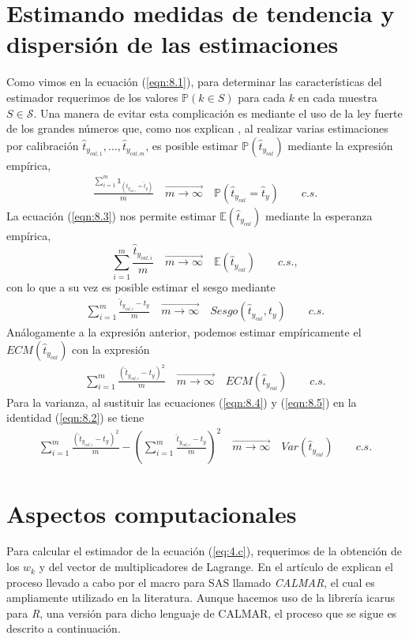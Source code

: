 \documentclass[a4paper,twoside,openright,12pt]{book}
\def\one{\mathds{1}}%
\theoremstyle{definition}
\newcommand\pref[1]{(\ref{#1})}
\numberwithin{equation}{chapter}
\numberwithin{figure}{chapter}
\numberwithin{table}{chapter}
\numberwithin{theorem}{chapter}
\numberwithin{lemma}{chapter}
\begin{document}
\section{Estimando medidas de tendencia y dispersión de las estimaciones}\label{sec:8.5}
Como vimos en la ecuación \pref{eqn:8.1}, para determinar las características del estimador requerimos de los valores $\mathbb{P}(k\in S)$ para cada $k$ en cada muestra $S\in \mathcal S$. Una manera de evitar esta complicación es mediante el uso de la ley fuerte de los grandes números que, como nos explican \cite{CIS-9995}, al realizar varias estimaciones por calibración $\hat t_{y_{cal,1}},\ldots, \hat t_{y_{cal,m}}$, es  posible estimar $\mathbb{P}(\hat t_{y_{cal}})$ mediante la expresión empírica,
\begin{align}\label{eqn:8.3}
\frac{\sum_{i=1}^m \one_{(\hat t_{y_{cal,i}}=\hat t_y)}}{m}\quad\overset{\longrightarrow}{\scriptscriptstyle m \rightarrow \infty}\quad \mathbb{P}(\hat t_{y_{cal}}=\hat t_y)\qquad c.s.
\end{align}
La ecuación \pref{eqn:8.3} nos permite estimar $\mathbb{E}(\hat t_{y_{cal}})$ mediante la esperanza empírica,
$$\sum_{i=1}^m \frac{\hat t_{y_{cal, i}}}{m}\quad\overset{\longrightarrow}{\scriptscriptstyle m \rightarrow \infty}\quad\mathbb E(\hat t_{y_{cal}})\qquad c.s.,$$
con lo que a su vez es posible estimar el sesgo mediante
\begin{align}\label{eqn:8.4}
	\sum_{i=1}^m \frac{\hat t_{y_{cal,i}}-t_y}{m}\quad\overset{\longrightarrow}{\scriptscriptstyle m \rightarrow \infty}\quad Sesgo(\hat t_{y_{cal}},t_y)\qquad c.s.
\end{align}
Análogamente a la expresión anterior, podemos estimar empíricamente el $ECM(\hat t_{y_{cal}})$ con la expresión
\begin{align}\label{eqn:8.5}
	\sum_{i=1}^m \frac{(\hat t_{y_{cal,i}}-t_{y})^2}{m}\quad\overset{\longrightarrow}{\scriptscriptstyle m \rightarrow \infty}\quad ECM(\hat t_{y_{cal}})\qquad c.s.
\end{align}
Para la varianza, al sustituir las ecuaciones \pref{eqn:8.4} y \pref{eqn:8.5} en la identidad \pref{eqn:8.2} se tiene
\begin{align}\label{eqn:8.6}
	\sum_{i=1}^m \frac{(\hat t_{y_{cal,i}}-t_{y})^2}{m}-\left(\sum_{i=1}^m \frac{\hat t_{y_{cal,i}}-t_y}{m}\right)^2\quad\overset{\longrightarrow}{\scriptscriptstyle m \rightarrow \infty}\quad Var(\hat t_{y_{cal}})\qquad c.s.
\end{align}
\section{Aspectos computacionales}\label{sec:9}
Para calcular el estimador de la ecuación \pref{eq:4.c}, requerimos de la obtención de los $w_k$ y del vector de multiplicadores de Lagrange. En el artículo de \cite{CIS-112732} explican el proceso llevado a cabo por el macro para SAS llamado \textsl{CALMAR}, el cual es ampliamente utilizado en la literatura. Aunque hacemos uso de la librería icarus para \textsl{R}, una versión para dicho lenguaje de CALMAR, el proceso que se sigue es descrito a continuación.
\end{document}
